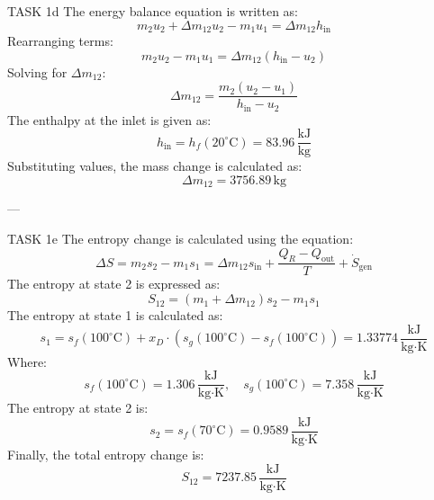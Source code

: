 TASK 1d  
The energy balance equation is written as:  
\[
m_2 u_2 + \Delta m_{12} u_2 - m_1 u_1 = \Delta m_{12} h_{\text{in}}
\]  
Rearranging terms:  
\[
m_2 u_2 - m_1 u_1 = \Delta m_{12} (h_{\text{in}} - u_2)
\]  
Solving for \( \Delta m_{12} \):  
\[
\Delta m_{12} = \frac{m_2 (u_2 - u_1)}{h_{\text{in}} - u_2}
\]  
The enthalpy at the inlet is given as:  
\[
h_{\text{in}} = h_f(20^\circ\text{C}) = 83.96 \, \frac{\text{kJ}}{\text{kg}}
\]  
Substituting values, the mass change is calculated as:  
\[
\Delta m_{12} = 3756.89 \, \text{kg}
\]  

---

TASK 1e  
The entropy change is calculated using the equation:  
\[
\Delta S = m_2 s_2 - m_1 s_1 = \Delta m_{12} s_{\text{in}} + \frac{Q_R - Q_{\text{out}}}{T} + \dot{S}_{\text{gen}}
\]  
The entropy at state 2 is expressed as:  
\[
S_{12} = (m_1 + \Delta m_{12}) s_2 - m_1 s_1
\]  
The entropy at state 1 is calculated as:  
\[
s_1 = s_f(100^\circ\text{C}) + x_D \cdot \left(s_g(100^\circ\text{C}) - s_f(100^\circ\text{C})\right) = 1.33774 \, \frac{\text{kJ}}{\text{kg·K}}
\]  
Where:  
\[
s_f(100^\circ\text{C}) = 1.306 \, \frac{\text{kJ}}{\text{kg·K}}, \quad s_g(100^\circ\text{C}) = 7.358 \, \frac{\text{kJ}}{\text{kg·K}}
\]  
The entropy at state 2 is:  
\[
s_2 = s_f(70^\circ\text{C}) = 0.9589 \, \frac{\text{kJ}}{\text{kg·K}}
\]  
Finally, the total entropy change is:  
\[
S_{12} = 7237.85 \, \frac{\text{kJ}}{\text{kg·K}}
\]
